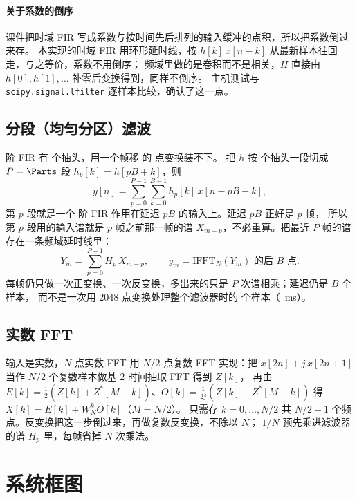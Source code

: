 \documentclass[zihao=-4, linespread=1.5, fontset=none]{ctexart}
\begin{document}
\paragraph{关于系数的倒序} 课件把时域 FIR 写成系数与按时间先后排列的输入缓冲的点积，所以把系数倒过来存。
本实现的时域 FIR 用环形延时线，按 $h[k]\,x[n-k]$ 从最新样本往回走，与之等价，系数不用倒序；
频域里做的是卷积而不是相关，$H$ 直接由 $h[0],h[1],\dots$ 补零后变换得到，同样不倒序。
主机测试与 \texttt{scipy.signal.lfilter} 逐样本比较，确认了这一点。

\subsection{分段（均匀分区）滤波}

\LongOrder{} 阶 FIR 有 \LongTaps{} 个抽头，用一个帧移 \Hop{} 的 \FftLen{} 点变换装不下。
把 $h$ 按 \Hop{} 个抽头一段切成 $P=\Parts$ 段 $h_p[k]=h[pB+k]$，则
\[
  y[n]=\sum_{p=0}^{P-1}\sum_{k=0}^{B-1}h_p[k]\,x[n-pB-k],
\]
第 $p$ 段就是一个 \ShortOrder{} 阶 FIR 作用在延迟 $pB$ 的输入上。延迟 $pB$ 正好是 $p$ 帧，
所以第 $p$ 段用的输入谱就是 $p$ 帧之前那一帧的谱 $X_{m-p}$，不必重算。把最近 $P$ 帧的谱存在一条频域延时线里：
\[
  Y_m=\sum_{p=0}^{P-1}H_p\,X_{m-p},\qquad y_m=\mathrm{IFFT}_N(Y_m)\text{ 的后 }B\text{ 点}.
\]
每帧仍只做一次正变换、一次反变换，多出来的只是 $P$ 次谱相乘；延迟仍是 $B$ 个样本，
而不是一次用 $2048$ 点变换处理整个滤波器时的 \LongTaps{} 个样本（\LongPlainMs~ms）。

\subsection{实数 FFT}

输入是实数，$N$ 点实数 FFT 用 $N/2$ 点复数 FFT 实现：把 $x[2n]+j\,x[2n+1]$ 当作 $N/2$ 个复数样本做基 2 时间抽取 FFT 得到 $Z[k]$，
再由 $E[k]=\frac12(Z[k]+Z^*[M-k])$、$O[k]=\frac1{2j}(Z[k]-Z^*[M-k])$ 得 $X[k]=E[k]+W_N^kO[k]$（$M=N/2$）。
只需存 $k=0,\dots,N/2$ 共 $N/2+1$ 个频点。反变换把这一步倒过来，再做复数反变换，不除以 $N$；
$1/N$ 预先乘进滤波器的谱 $H_p$ 里，每帧省掉 $N$ 次乘法。

\section{系统框图}
\end{document}
